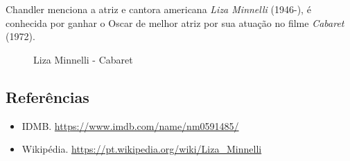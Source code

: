 \saveparinfos
\noindent
\begin{minipage}[c]{0.5\textwidth}\useparinfo

Chandler menciona a atriz e cantora americana \emph{Liza Minnelli}
(1946-), é conhecida por ganhar o Oscar de melhor atriz por sua atuação
no filme \emph{Cabaret} (1972).

\end{minipage}\hfill
\begin{minipage}[c]{0.5\textwidth}

\begin{figure}
  \centering
    \caption{Liza Minnelli - Cabaret\label{fig:liza-minnelli-cabaret}}
\end{figure}

\end{minipage}

\hypertarget{referuxeancias-8}{%
\subsection{Referências}\label{referuxeancias-8}}

\begin{itemize}
\tightlist
\item
  \sloppy IDMB. \url{https://www.imdb.com/name/nm0591485/}
\item
  \sloppy Wikipédia. \url{https://pt.wikipedia.org/wiki/Liza_Minnelli}
\end{itemize}
